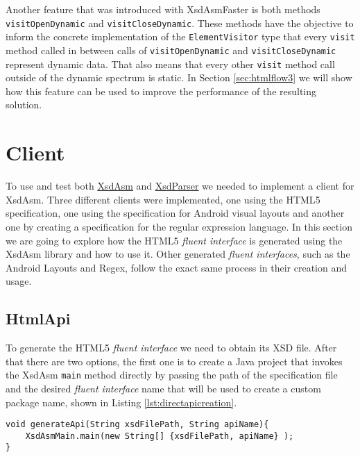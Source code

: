 \noindent
Another feature that was introduced with XsdAsmFaster is both methods \texttt{visitOpenDynamic} and \texttt{visitCloseDynamic}. These methods have the objective to inform the concrete implementation of the \texttt{ElementVisitor} type that every \texttt{visit} method called in between calls of \texttt{visitOpenDynamic} and \texttt{visitCloseDynamic} represent dynamic data. That also means that every other \texttt{visit} method call outside of the dynamic spectrum is static. In Section \ref{sec:htmlflow3} we will show how this feature can be used to improve the performance of the resulting solution.

\newpage

\section{Client} %
\label{sec:client}

To use and test both \hyperref[sec:xsdasm]{XsdAsm} and \hyperref[sec:xsdparser]{XsdParser} we needed to implement a client for XsdAsm. Three different clients were implemented, one using the \ac{HTML}5 specification, one using the specification for Android visual layouts and another one by creating a specification for the regular expression language. In this section we are going to explore how the \ac{HTML}5 \textit{fluent interface} is generated using the XsdAsm library and how to use it. Other generated \textit{fluent interfaces}, such as the Android Layouts and Regex, follow the exact same process in their creation and usage.

\subsection{HtmlApi}
\label{sec:htmlapi}

To generate the \ac{HTML}5 \textit{fluent interface} we need to obtain its \ac{XSD} file. After that there are two options, the first one is to create a Java project that invokes the XsdAsm \texttt{main} method directly by passing the path of the specification file and the desired \textit{fluent interface} name that will be used to create a custom package name, shown in Listing \ref{lst:directapicreation}.

\bigskip


\begin{minipage}{\linewidth}
\begin{lstlisting}[caption={Fluent Interface Creation},label={lst:directapicreation}]
void generateApi(String xsdFilePath, String apiName){
    XsdAsmMain.main(new String[] {xsdFilePath, apiName} );    
}
\end{lstlisting}
\end{minipage}

